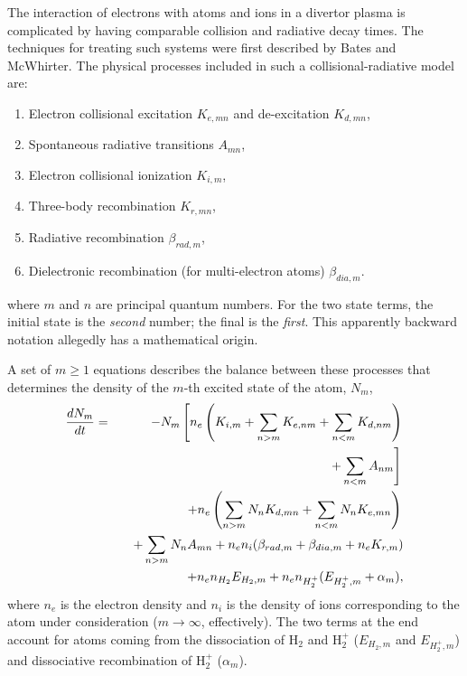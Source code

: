 \documentclass[12pt]{report}
\begin{document}
The interaction of electrons with atoms and ions in a divertor
plasma is complicated by having comparable collision and radiative
decay times. The techniques for treating such systems were first 
described by Bates and McWhirter\cite{Bate61,McWh65}. The physical
processes included in such a collisional-radiative model are:
  \begin{enumerate}
    \item Electron collisional excitation $K_{e,mn}$ and de-excitation
$K_{d,mn}$,
    \item Spontaneous radiative transitions $A_{mn}$,
    \item Electron collisional ionization $K_{i,m}$,
    \item Three-body recombination $K_{r,mn}$,
    \item Radiative recombination $\beta_{rad,m}$,
    \item Dielectronic recombination (for multi-electron atoms) 
      $\beta_{dia,m}$.
\end{enumerate}
where $m$ and $n$ are principal quantum numbers. For the two state
terms, the initial state is the {\em second} number; the final is the
{\em first}. This apparently backward notation allegedly has a mathematical
origin.

A set of $m \geq 1$ equations describes the balance between these processes that
determines the density of the $m$-th excited state of the atom,
$N_{m}$,
\begin{eqnarray}
\frac{d N_{m}}{d t} & = & - N_{m} \left[ n_{e} \left( K_{i,m} + \sum_{n > m}
K_{e,nm} + \sum_{n < m} K_{d,nm} \right) \right. \nonumber \\
& & \qquad \quad \left. + \sum_{n < m} A_{nm} \right] \rule[-1ex]{0ex}{4ex} \nonumber \\
& & \quad + n_{e} \left( \sum_{n > m} N_{n} K_{d,mn} + \sum_{n < m} N_{n} K_{e,mn} 
    \right) \rule[-2ex]{0ex}{4ex} \nonumber \\ & & \quad +
  \sum_{n > m} N_{n} A_{mn} + n_{e} n_{i} ( \beta_{rad,m} + \beta_{dia,m} + n_{e}
                                                   K_{r,m})  \nonumber \\
  & & \quad + n_{e} n_{H_{2}} E_{H_{2},m} + n_{e} n_{H_{2}^{+}}(E_{H_{2}^+,m} + \alpha_{m}),
\label{crmodel}
\end{eqnarray}
where $n_{e}$ is the electron density and $n_{i}$ is the density of ions
corresponding to the atom under consideration ($m \rightarrow \infty$,
effectively).
The two terms at the end account for atoms coming from the dissociation
of H$_{2}$ and H$_{2}^{+}$ ($E_{H_{2},m}$ and $E_{H_{2}^+,m}$) and dissociative
recombination of H$_{2}^{+}$ ($\alpha_{m}$).
\end{document}
